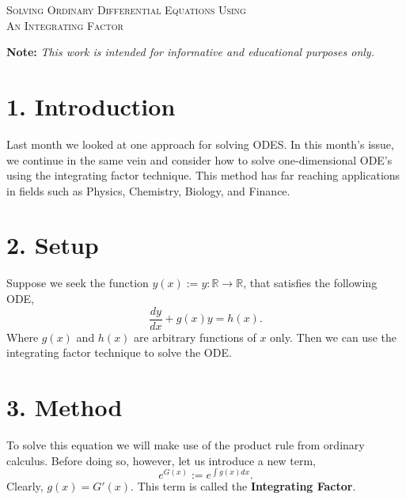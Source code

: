 \documentclass[11pt]{article}
\begin{document}

\begin{tcolorbox}
\begin{center}
    \large
    \textsc{Solving Ordinary Differential Equations Using \\ An Integrating Factor}
\end{center}
\end{tcolorbox}

\begin{center}
\textbf{Note:} \textit{This work is intended for informative and educational purposes only.}
\end{center}

\section*{1. Introduction}
Last month we looked at one approach for solving ODES. In this month's issue, we continue in the same vein and consider how to solve one-dimensional ODE's using the integrating factor technique. This method has far reaching applications in fields such as Physics, Chemistry, Biology, and Finance.

\section*{2. Setup}
Suppose we seek the function $y(x) := y: \mathbb{R} \longrightarrow \mathbb{R}$, that satisfies the following ODE,
\begin{equation}
    \frac{dy}{dx} + g(x)y = h(x).
\end{equation}
Where $g(x)$ and $h(x)$ are arbitrary functions of $x$ only. Then we can use the integrating factor technique to solve the ODE. 

\section*{3. Method}
To solve this equation we will make use of the product rule from ordinary calculus. Before doing so, however, let us introduce a new term,
\begin{equation}
    e^{G(x)} := e^{\int g(x) dx}.
\end{equation}
Clearly, $g(x) = G'(x)$. This term is called the \textbf{Integrating Factor}.
\end{document}
